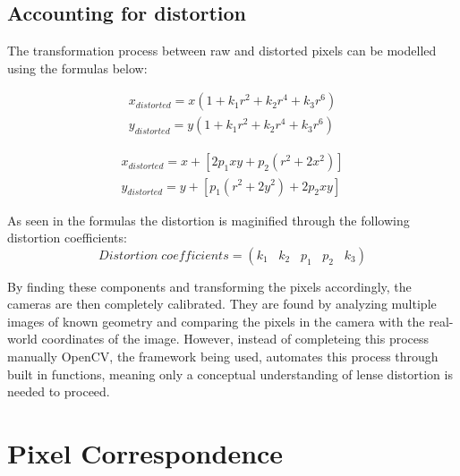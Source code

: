\documentclass[11pt]{scrartcl}
\begin{document}
\subsection{Accounting for distortion}

The transformation process between raw and distorted pixels can be modelled using the 
formulas below: 

\begin{theorem}
    \begin{align}
    x_{distorted} = x( 1 + k_1 r^2 + k_2 r^4 + k_3 r^6) 
    \\ y_{distorted} = y( 1 + k_1 r^2 + k_2 r^4 + k_3 r^6)    
    \end{align}
    
\end{theorem}


\begin{theorem}
    \begin{align}
        x_{distorted} = x + [ 2p_1xy + p_2(r^2+2x^2)]  
       \\ y_{distorted} = y + [ p_1(r^2+ 2y^2)+ 2p_2xy]
    \end{align}
    
\end{theorem}

As seen in the formulas the distortion is maginified through the following distortion coefficients: 
\begin{displaymath}
    Distortion \; coefficients=(k_1 \hspace{10pt} k_2 \hspace{10pt} p_1 \hspace{10pt} p_2 \hspace{10pt} k_3)
\end{displaymath}

By finding these components and transforming the pixels accordingly, the cameras are then 
completely calibrated. They are found by analyzing multiple images of known geometry and 
comparing the pixels in the camera with the real-world coordinates of the image. However, 
instead of completeing this process manually OpenCV, the framework being used, automates this 
process through built in functions, meaning only a conceptual understanding of lense distortion 
is needed to proceed. 

\section{Pixel Correspondence}
\end{document}
